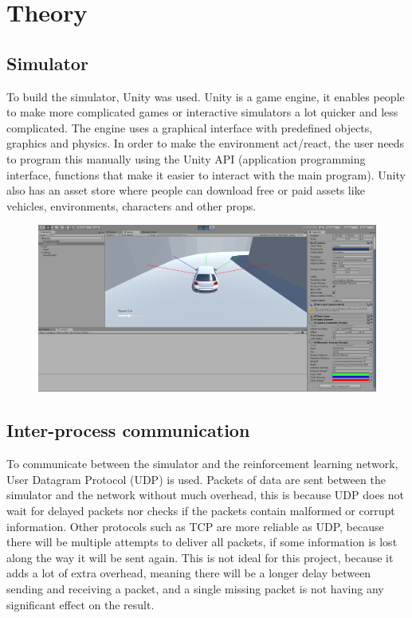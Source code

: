 \documentclass{article}
\begin{document}
\newpage

\section{Theory}
\subsection{Simulator}
To build the simulator, Unity was used. Unity is a game engine, it enables people to make more complicated games or interactive simulators a lot quicker and less complicated. The engine uses a graphical interface with predefined objects, graphics and physics. In order to make the environment act/react, the user needs to program this manually using the Unity API (application programming interface, functions that make it easier to interact with the main program). Unity also has an asset store where people can download free or paid assets like vehicles, environments, characters and other props. 

\begin{figure}
\includegraphics[width=\linewidth]{simulator_env}
\end{figure}

\subsection{Inter-process communication}
To communicate between the simulator and the reinforcement learning network, User Datagram Protocol (UDP) is used. Packets of data are sent between the simulator and the network without much overhead, this is because UDP does not wait for delayed packets nor checks if the packets contain malformed or corrupt information. Other protocols such as TCP are more reliable as UDP, because there will be multiple attempts to deliver all packets, if some information is lost along the way it will be sent again. This is not ideal for this project, because it adds a lot of extra overhead, meaning there will be a longer delay between sending and receiving a packet, and a single missing packet is not having any significant effect on the result.
\end{document}
